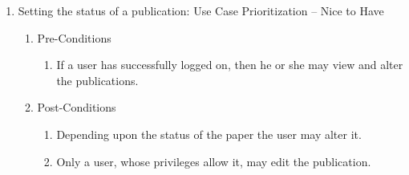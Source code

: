 \documentclass[10pt,a4paper]{exam}
\begin{document}
\begin{enumerate}
\item  Setting the status of a publication: Use Case Prioritization -- Nice to Have

\begin{enumerate}
\item  Pre-Conditions

\begin{enumerate}
\item  If a user has successfully logged on, then he or she may view and alter the publications.
\end{enumerate}

\item  Post-Conditions

\begin{enumerate}
\item  Depending upon the status of the paper the user may alter it.

\item  Only a user, whose privileges allow it, may edit the publication. 
\end{enumerate}
\end{enumerate}
\end{enumerate}

\noindent  
\end{document}
